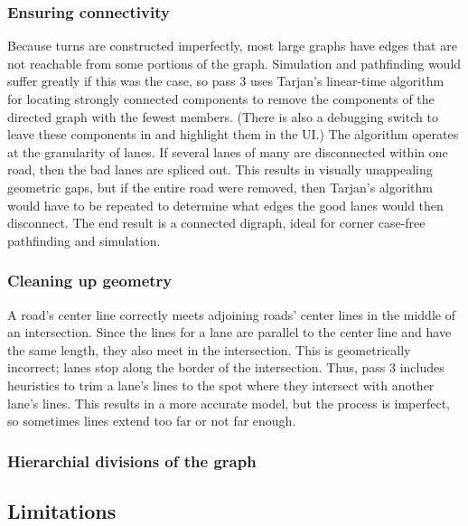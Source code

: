 \documentclass[letterpaper, 10 pt, conference]{ieeeconf}  %
\begin{document}
\subsubsection{Ensuring connectivity}

Because turns are constructed imperfectly, most large graphs have edges that are
not reachable from some portions of the graph. Simulation and pathfinding would
suffer greatly if this was the case, so pass 3 uses Tarjan's linear-time
algorithm for locating strongly connected components to remove the components of
the directed graph with the fewest members. (There is also a debugging switch to
leave these components in and highlight them in the UI.) The algorithm operates
at the granularity of lanes. If several lanes of many are disconnected within
one road, then the bad lanes are spliced out. This results in visually
unappealing geometric gaps, but if the entire road were removed, then Tarjan's
algorithm would have to be repeated to determine what edges the good lanes would
then disconnect. The end result is a connected digraph, ideal for corner
case-free pathfinding and simulation.

\subsubsection{Cleaning up geometry}

A road's center line correctly meets adjoining roads' center lines in the middle
of an intersection. Since the lines for a lane are parallel to the center line
and have the same length, they also meet in the intersection. This is
geometrically incorrect; lanes stop along the border of the intersection. Thus,
pass 3 includes heuristics to trim a lane's lines to the spot where they
intersect with another lane's lines. This results in a more accurate model, but
the process is imperfect, so sometimes lines extend too far or not far enough.

\subsubsection{Hierarchial divisions of the graph}


\subsection{Limitations}
\end{document}
